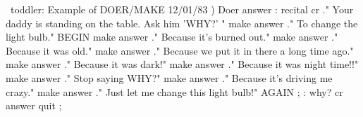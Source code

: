 \vfill
\begin{Screen}
\ toddler: Example of DOER/MAKE                      12/01/83 )
Doer answer
: recital
  cr ." Your daddy is standing on the table.  Ask him 'WHY?' "
  make answer  ." To change the light bulb."
  BEGIN
  make answer  ." Because it's burned out."
  make answer  ." Because it was old."
  make answer  ." Because we put it in there a long time ago."
  make answer  ." Because it was dark!"
  make answer  ." Because it was night time!!"
  make answer  ." Stop saying WHY?"
  make answer  ." Because it's driving me crazy."
  make answer  ." Just let me change this light bulb!"
  AGAIN ;
: why?   cr  answer  quit ;
\end{Screen}
\vfill
